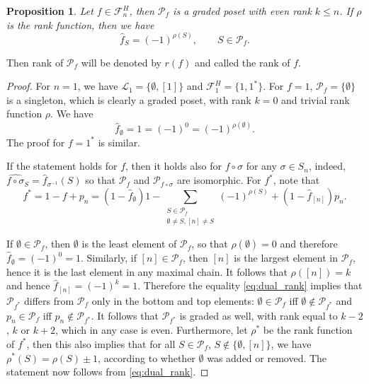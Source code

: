 \documentclass[12pt]{article}
\newtheorem{prop}{Proposition}
\theoremstyle{definition}
\theoremstyle{remark}
\def\Pe{\mathcal P}
\def\Fe{\mathcal F}
\begin{document}
\begin{prop}\label{prop:graded} Let $f\in \Fe_n^H$, then $\mathcal P_f$ is a graded poset
with even rank $k\le n$. If $\rho$ is the rank function, then we have
\[
\hat f_S=(-1)^{\rho(S)},\qquad S\in \mathcal P_f.
\]

\end{prop}

Then rank of $\Pe_f$ will be denoted by $r(f)$ and called the rank of $f$.

\begin{proof} For $n=1$, we have $\mathcal L_1=\{\emptyset, [1]\}$ and
$\Fe_1^H=\{1,1^*\}$. For $f=1$, $\mathcal P_f=\{\emptyset\}$ is a singleton, which 
is clearly a graded poset, with rank $k=0$ and trivial rank function $\rho$.  We have
\[
\hat f_\emptyset = 1=(-1)^0=(-1)^{\rho(\emptyset)}.
\]
The proof for $f=1^*$ is similar.

If the statement
holds for $f$, then it holds also for $f\circ \sigma$ for any $\sigma\in S_n$, indeed,
$\widehat{f\circ \sigma}_S=\hat f_{\sigma^{-1}}(S)$ so that 
$\mathcal P_f$ and $\mathcal P_{f\circ \sigma}$ are isomorphic. For $f^*$, note that
\begin{equation}\label{eq:dual_rank}
f^*=1-f+p_n=(1-\hat f_\emptyset)1 -\sum_{\substack{S\in \mathcal P_f\\ \emptyset \ne S,
[n]\ne S}}
(-1)^{\rho(S)}+(1- \hat f_{[n]})p_n.
\end{equation}

If $\emptyset \in \Pe_f$, then $\emptyset$ is the least element of $\Pe_f$, so that 
$\rho(\emptyset)=0$ and therefore $\hat f_\emptyset =
(-1)^0=1$. Similarly, if $[n]\in \Pe_f$, then $[n]$ is the largest element in $\Pe_f$,
hence it is the last element in any maximal chain. It follows that $\rho([n])=k$ and hence
$\hat f_{[n]}=(-1)^k=1$. 
Therefore the equality \eqref{eq:dual_rank} implies that $\mathcal P_{f^*}$ differs from $\mathcal P_f$ only in the bottom  and
top elements:  $\emptyset \in \mathcal P_f$ iff  $\emptyset \notin \mathcal P_{f^*}$
and $p_n \in \mathcal P_f$ iff  $p_n \notin \mathcal P_{f^*}$. It follows that $\mathcal
P_{f^*}$ is graded as well, with rank  equal to $k-2$, $k$ or $k+2$, which in any case
is even. Furthermore, let $\rho^*$ be the rank function of $f^*$, then this also implies 
that for all $S\in \Pe_f$, $S\notin \{\emptyset, [n]\}$, we
have  $\rho^*(S)=\rho(S)\pm 1$, according to whether $\emptyset$ was added or removed. The
statement now follows from \eqref{eq:dual_rank}. 



\end{proof}
\end{document}
